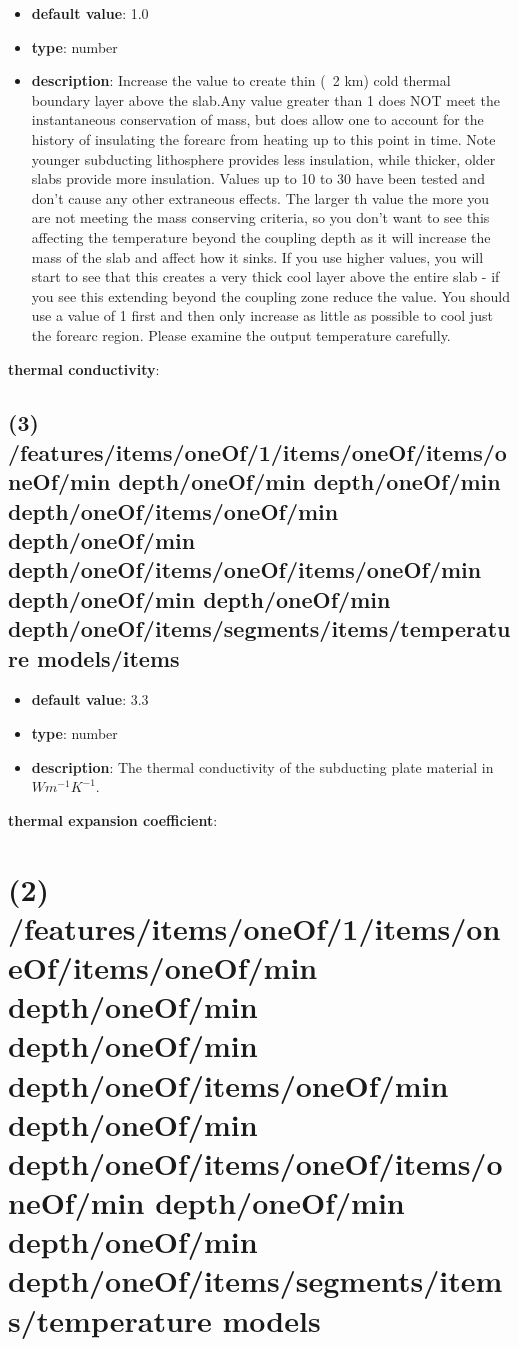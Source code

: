 \begin{itemize}[leftmargin=4em]\item {\bf default value}: 1.0
\item {\bf type}: number
\item {\bf description}: Increase the value to create thin (~2 km) cold thermal boundary layer above the slab.Any value greater than 1 does NOT meet the instantaneous conservation of mass, but does allow one to account for the history of insulating the forearc from heating up to this point in time. Note younger subducting lithosphere provides less insulation, while thicker, older slabs provide more insulation. Values up to 10 to 30 have been tested and don't cause any other extraneous effects. The larger th value the more you are not meeting the mass conserving criteria, so you don't want to see this affecting the temperature beyond the coupling depth as it will increase the mass of the slab and affect how it sinks.  If you use higher values, you will start to see that this creates a very thick cool layer above the entire slab - if you see this extending beyond the coupling zone reduce the value. You should use a value of 1 first and then only increase as little as possible to cool just the forearc region. Please examine the output temperature carefully. 
\end{itemize}\item {\bf thermal conductivity}: \subsection{(3) /features/items/oneOf/1/items/oneOf/items/oneOf/min depth/oneOf/min depth/oneOf/min depth/oneOf/items/oneOf/min depth/oneOf/min depth/oneOf/items/oneOf/items/oneOf/min depth/oneOf/min depth/oneOf/min depth/oneOf/items/segments/items/temperature models/items}
\begin{itemize}[leftmargin=3em]\item {\bf default value}: 3.3
\item {\bf type}: number
\item {\bf description}: The thermal conductivity of the subducting plate material in $W m^{-1} K^{-1}$.
\end{itemize}\item {\bf thermal expansion coefficient}: \section{(2) /features/items/oneOf/1/items/oneOf/items/oneOf/min depth/oneOf/min depth/oneOf/min depth/oneOf/items/oneOf/min depth/oneOf/min depth/oneOf/items/oneOf/items/oneOf/min depth/oneOf/min depth/oneOf/min depth/oneOf/items/segments/items/temperature models}
